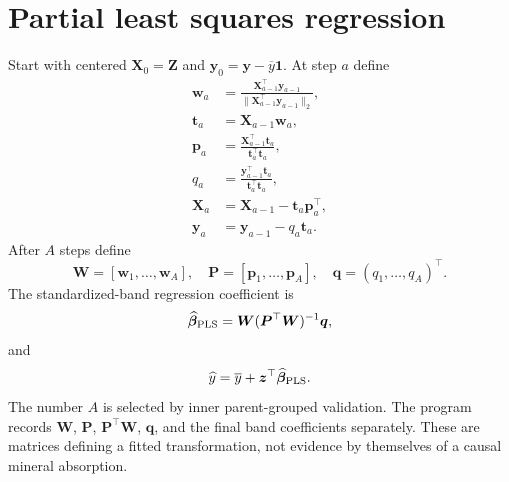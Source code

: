 \documentclass[11pt]{article}
\begin{document}
\section{Partial least squares regression}
Start with centered $\bm X_0=\bm Z$ and $\bm y_0=\bm y-\overline y\bm1$. At step $a$ define
\begin{align}
 \bm w_a&=\frac{\bm X_{a-1}^\top\bm y_{a-1}}
 {\|\bm X_{a-1}^\top\bm y_{a-1}\|_2},\\
 \bm t_a&=\bm X_{a-1}\bm w_a,\\
 \bm p_a&=\frac{\bm X_{a-1}^\top\bm t_a}{\bm t_a^\top\bm t_a},\\
 q_a&=\frac{\bm y_{a-1}^\top\bm t_a}{\bm t_a^\top\bm t_a},\\
 \bm X_a&=\bm X_{a-1}-\bm t_a\bm p_a^\top,\\
 \bm y_a&=\bm y_{a-1}-q_a\bm t_a.
\end{align}
After $A$ steps define
\begin{equation}
 \bm W=[\bm w_1,\ldots,\bm w_A],\quad
 \bm P=[\bm p_1,\ldots,\bm p_A],\quad
 \bm q=(q_1,\ldots,q_A)^\top.
\end{equation}
The standardized-band regression coefficient is
\begin{equation}
 \widehat{\bm\beta}_{\rm PLS}
 =\bm W(\bm P^\top\bm W)^{-1}\bm q,
\end{equation}
and
\begin{equation}
 \widehat y=\overline y+\bm z^\top\widehat{\bm\beta}_{\rm PLS}.
\end{equation}
The number $A$ is selected by inner parent-grouped validation. The program records $\bm W$, $\bm P$, $\bm P^\top\bm W$, $\bm q$, and the final band coefficients separately. These are matrices defining a fitted transformation, not evidence by themselves of a causal mineral absorption.
\end{document}
